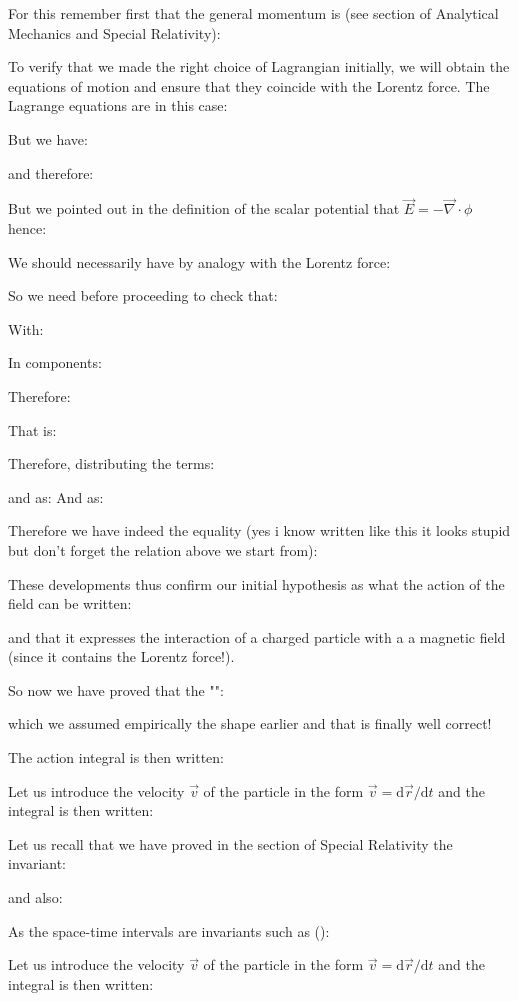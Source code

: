 	For this remember first that the general momentum is (see section of Analytical Mechanics and Special Relativity):
	
	To verify that we made the right choice of Lagrangian initially, we will obtain the equations of motion and ensure that they coincide with the Lorentz force. The Lagrange equations are in this case:
	
	But we have:
	
	and therefore:
	
	But we pointed out in the definition of the scalar potential that $\vec{E}=-\vec{\nabla}\cdot\phi$ hence:
	
	We should necessarily have by analogy with the Lorentz force:
	
	So we need before proceeding to check that:
	
	With:
	
	In components:
	
	Therefore:
	
	That is:
	
	Therefore, distributing the terms:
	
	and as:
	And as:
	
	Therefore we have indeed the equality (yes i know written like this it looks stupid but don't forget the relation above we start from):
	
	These developments thus confirm our initial hypothesis as what the action of the field can be written:
	
	and that it expresses the interaction of a charged particle with a a magnetic field (since it contains the Lorentz force!).

	So now we have proved that the "":
	
	which we assumed empirically the shape earlier and that is finally well correct!

	The action integral is then written:
	
	Let us introduce the velocity $\vec{v}$ of the particle in the form $\vec{v}=\mathrm{d}\vec{r}/\mathrm{d}t$ and the integral is then written:
	
	Let us recall that we have proved in the section of Special Relativity the invariant:
	
	and also:
	
	As the space-time intervals are invariants such as ():
	
	
	Let us introduce the velocity $\vec{v}$ of the particle in the form $\vec{v}=\mathrm{d}\vec{r}/\mathrm{d}t$ and the integral is then written:
	
